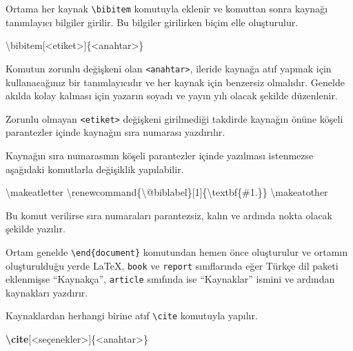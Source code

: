 \documentclass[
  10pt,
]{scrbook}
\newenvironment{Shaded}{\begin{snugshade}}{\end{snugshade}}
\newcommand{\ExtensionTok}[1]{#1}
\newcommand{\FunctionTok}[1]{\textcolor[rgb]{0.00,0.00,0.00}{#1}}
\newcommand{\KeywordTok}[1]{\textcolor[rgb]{0.13,0.29,0.53}{\textbf{#1}}}
\newcommand{\NormalTok}[1]{#1}
\theoremstyle{definition}
\theoremstyle{definition}
\theoremstyle{definition}
\theoremstyle{definition}
\theoremstyle{remark}
\begin{document}
Ortama her kaynak \texttt{\textbackslash{}bibitem} komutuyla eklenir ve komuttan sonra kaynağı
tanımlayıcı bilgiler girilir. Bu bilgiler girilirken biçim elle
oluşturulur.

\begin{Shaded}
\begin{Highlighting}[]
\FunctionTok{\textbackslash{}bibitem}\NormalTok{[\textless{}etiket\textgreater{}]\{\textless{}anahtar\textgreater{}\}}
\end{Highlighting}
\end{Shaded}

Komutun zorunlu değişkeni olan \texttt{\textless{}anahtar\textgreater{}}, ileride kaynağa atıf yapmak
için kullanacağınız bir tanımlayıcıdır ve her kaynak için benzersiz
olmalıdır. Genelde akılda kolay kalması için yazarın soyadı ve yayın
yılı olacak şekilde düzenlenir.

Zorunlu olmayan \texttt{\textless{}etiket\textgreater{}} değişkeni girilmediği takdirde kaynağın önüne
köşeli parantezler içinde kaynağın sıra numarası yazdırılır.

Kaynağın sıra numarasının köşeli parantezler içinde yazılması istenmezse
aşağıdaki komutlarla değişiklik yapılabilir.

\begin{Shaded}
\begin{Highlighting}[]
\FunctionTok{\textbackslash{}makeatletter}
\FunctionTok{\textbackslash{}renewcommand}\NormalTok{\{}\ExtensionTok{\textbackslash{}@biblabel}\NormalTok{\}[1]\{}\FunctionTok{\textbackslash{}textbf}\NormalTok{\{\#1.\}\}}
\FunctionTok{\textbackslash{}makeatother}
\end{Highlighting}
\end{Shaded}

Bu komut verilirse sıra numaraları parantezsiz, kalın ve ardında nokta
olacak şekilde yazılır.

Ortam genelde \texttt{\textbackslash{}end\{document\}} komutundan hemen önce oluşturulur ve
ortamın oluşturulduğu yerde LaTeX, \texttt{book} ve \texttt{report} sınıflarında eğer
Türkçe dil paketi eklenmişse ``Kaynakça'', \texttt{article} sınıfında ise
``Kaynaklar'' ismini ve ardından kaynakları yazdırır.

Kaynaklardan herhangi birine atıf \texttt{\textbackslash{}cite} komutuyla yapılır.

\begin{Shaded}
\begin{Highlighting}[]
\KeywordTok{\textbackslash{}cite}\NormalTok{[\textless{}seçenekler\textgreater{}]\{}\ExtensionTok{\textless{}anahtar\textgreater{}}\NormalTok{\}}
\end{Highlighting}
\end{Shaded}
\end{document}
